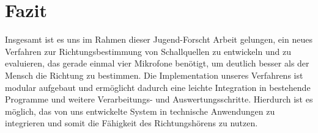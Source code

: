 \section{Fazit}
Insgesamt ist es uns im Rahmen dieser Jugend-Forscht Arbeit gelungen, ein neues Verfahren zur Richtungsbestimmung von Schallquellen zu entwickeln und zu evaluieren, das gerade einmal vier Mikrofone benötigt, um deutlich besser als der Mensch die Richtung zu bestimmen. Die Implementation unseres Verfahrens ist modular aufgebaut und ermöglicht dadurch eine leichte Integration in bestehende Programme und weitere Verarbeitungs- und Auswertungsschritte. Hierdurch ist es möglich, das von uns entwickelte System in technische Anwendungen zu integrieren und somit die Fähigkeit des Richtungshörens zu nutzen. 